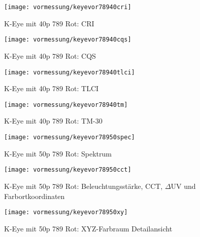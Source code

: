 \documentclass[pagesize,paper=A4,fontsize=12pt,utf8,numbers=noenddot,bibliography=totoc,listof=totoc,DIV=11,BCOR=1mm]{scrreprt}
\begin{document}
\begin{figure}[htp]     %
\centering
\texttt{[image: vormessung/keyevor78940cri]} 
\caption {K-Eye mit 40p 789 Rot: CRI} 
\end{figure}

\begin{figure}[htp]     %
\centering
\texttt{[image: vormessung/keyevor78940cqs]} 
\caption {K-Eye mit 40p 789 Rot: CQS} 
\end{figure}

\begin{figure}[htp]     %
\centering
\texttt{[image: vormessung/keyevor78940tlci]} 
\caption {K-Eye mit 40p 789 Rot: TLCI} 
\end{figure}

\begin{figure}[htp]     %
\centering
\texttt{[image: vormessung/keyevor78940tm]} 
\caption {K-Eye mit 40p 789 Rot: TM-30} 
\end{figure}




\begin{figure}[htp]     %
\centering
\texttt{[image: vormessung/keyevor78950spec]} 
\caption {K-Eye mit 50p 789 Rot: Spektrum} 
\end{figure}

\begin{figure}[htp]     %
\centering
\texttt{[image: vormessung/keyevor78950cct]} 
\caption {K-Eye mit 50p 789 Rot: Beleuchtungsstärke, CCT, $\Delta$UV und Farbortkoordinaten} 
\end{figure}

\begin{figure}[htp]     %
\centering
\texttt{[image: vormessung/keyevor78950xy]} 
\caption {K-Eye mit 50p 789 Rot: XYZ-Farbraum Detailansicht} 
\end{figure}
\end{document}
